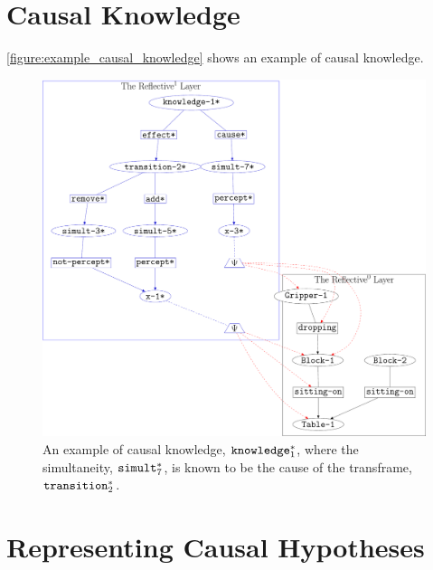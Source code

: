 \section{Causal Knowledge}

{\mbox{\autoref{figure:example_causal_knowledge}}} shows an example of
causal knowledge.
\begin{figure}
\center
\includegraphics[width=12cm]{gfx/example_causal_knowledge}
\caption[An example of a causal hypothesis.]{An example of causal
  knowledge, $\text{\tt{knowledge}}_1^*$, where the simultaneity,
  $\text{\tt{simult}}_7^*$, is known to be the cause of the
  transframe, $\text{\tt{transition}}_2^*$.}
\label{figure:example_causal_knowledge}
\end{figure}

\section{Representing Causal Hypotheses}

